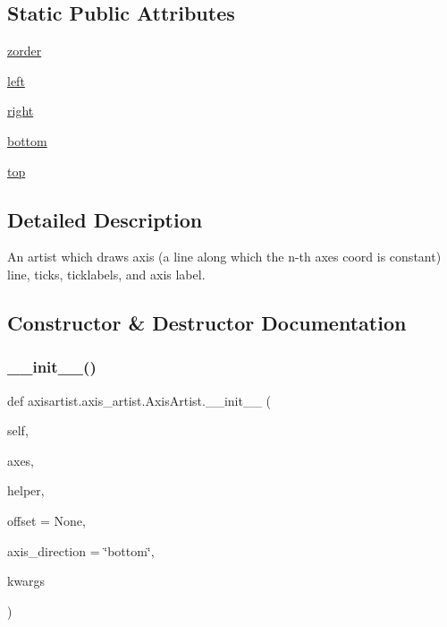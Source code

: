 \subsection*{Static Public Attributes}
\begin{DoxyCompactItemize}
\item 
\hyperlink{classaxisartist_1_1axis__artist_1_1AxisArtist_a370844827c407a1f155f735d5370ba4c}{zorder}
\item 
\hyperlink{classaxisartist_1_1axis__artist_1_1AxisArtist_a4095a63deef9c3c6afa7852e6b72670a}{left}
\item 
\hyperlink{classaxisartist_1_1axis__artist_1_1AxisArtist_a0e2aa4fb8533f43d324b066ce202770e}{right}
\item 
\hyperlink{classaxisartist_1_1axis__artist_1_1AxisArtist_adc8b19e4f938fe1722246dd2cd2b7790}{bottom}
\item 
\hyperlink{classaxisartist_1_1axis__artist_1_1AxisArtist_a1430b0f49558960d809472d5fe329bb9}{top}
\end{DoxyCompactItemize}


\subsection{Detailed Description}
\begin{DoxyVerb}An artist which draws axis (a line along which the n-th axes coord
is constant) line, ticks, ticklabels, and axis label.
\end{DoxyVerb}
 

\subsection{Constructor \& Destructor Documentation}
\mbox{\label{classaxisartist_1_1axis__artist_1_1AxisArtist_a34ca558944e8d059643c645d9a1da0a1}} 
\subsubsection{\texorpdfstring{\+\_\+\+\_\+init\+\_\+\+\_\+()}{\_\_init\_\_()}}
{\footnotesize\ttfamily def axisartist.\+axis\+\_\+artist.\+Axis\+Artist.\+\_\+\+\_\+init\+\_\+\+\_\+ (\begin{DoxyParamCaption}\item[{}]{self,  }\item[{}]{axes,  }\item[{}]{helper,  }\item[{}]{offset = {\ttfamily None},  }\item[{}]{axis\+\_\+direction = {\ttfamily \char`\"{}bottom\char`\"{}},  }\item[{}]{kwargs }\end{DoxyParamCaption})}

